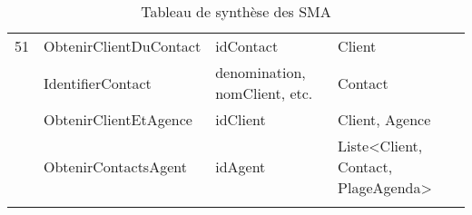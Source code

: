 \begin{table}[H]
{\begin{tabular}{P{0.8cm}P{5.5cm}P{6cm}P{6cm}}
			51 & ObtenirClientDuContact & idContact &  Client \\  & IdentifierContact & denomination, nomClient, etc. &  Contact \\  & ObtenirClientEtAgence & idClient &  Client, Agence \\  & ObtenirContactsAgent & idAgent &  Liste<Client, Contact, PlageAgenda> \\ \hline
{}\hline
		\end{tabular}
	}
	\caption{Tableau de synthèse des SMA}
\end{table}

